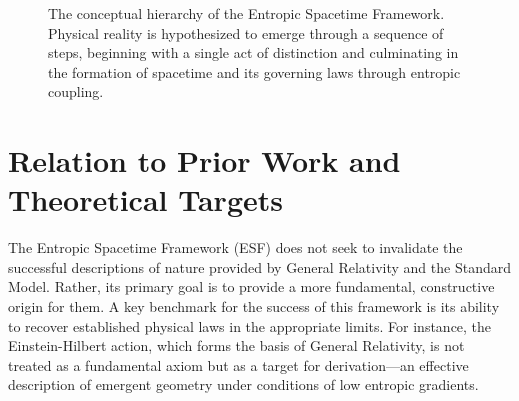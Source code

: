 \documentclass[12pt, a4paper]{article}
\begin{document}
\begin{figure}[h!]
\centering
{}
\caption{The conceptual hierarchy of the Entropic Spacetime Framework. Physical reality is hypothesized to emerge through a sequence of steps, beginning with a single act of distinction and culminating in the formation of spacetime and its governing laws through entropic coupling.}
\label{fig:flowchart}
\end{figure}

\section{Relation to Prior Work and Theoretical Targets}
\label{sec:prior_work}

The Entropic Spacetime Framework (ESF) does not seek to invalidate the successful descriptions of nature provided by General Relativity and the Standard Model. Rather, its primary goal is to provide a more fundamental, constructive origin for them. A key benchmark for the success of this framework is its ability to recover established physical laws in the appropriate limits. For instance, the Einstein-Hilbert action, which forms the basis of General Relativity, is not treated as a fundamental axiom but as a target for derivation—an effective description of emergent geometry under conditions of low entropic gradients.
\end{document}
